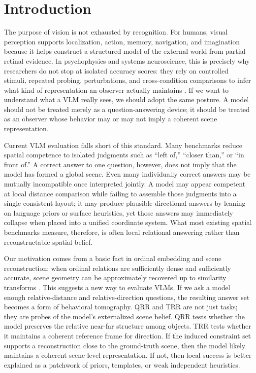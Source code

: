 \section{Introduction}

The purpose of vision is not exhausted by recognition. For humans, visual perception supports localization, action, memory, navigation, and imagination because it helps construct a structured model of the external world from partial retinal evidence. In psychophysics and systems neuroscience, this is precisely why researchers do not stop at isolated accuracy scores: they rely on controlled stimuli, repeated probing, perturbations, and cross-condition comparisons to infer what kind of representation an observer actually maintains \cite{kriegeskorte2008rsa,yamins2016dicarlo}. If we want to understand what a VLM really sees, we should adopt the same posture. A model should not be treated merely as a question-answering device; it should be treated as an observer whose behavior may or may not imply a coherent scene representation.

Current VLM evaluation falls short of this standard. Many benchmarks reduce spatial competence to isolated judgments such as ``left of,'' ``closer than,'' or ``in front of.'' A correct answer to one question, however, does not imply that the model has formed a global scene. Even many individually correct answers may be mutually incompatible once interpreted jointly. A model may appear competent at local distance comparison while failing to assemble those judgments into a single consistent layout; it may produce plausible directional answers by leaning on language priors or surface heuristics, yet those answers may immediately collapse when placed into a unified coordinate system. What most existing spatial benchmarks measure, therefore, is often local relational answering rather than reconstructable spatial belief.

Our motivation comes from a basic fact in ordinal embedding and scene reconstruction: when ordinal relations are sufficiently dense and sufficiently accurate, scene geometry can be approximately recovered up to similarity transforms \cite{agarwal2007gnmds,ma2018robustordinal,dokmanic2015edm}. This suggests a new way to evaluate VLMs. If we ask a model enough relative-distance and relative-direction questions, the resulting answer set becomes a form of behavioral tomography. QRR and TRR are not just tasks; they are probes of the model's externalized scene belief. QRR tests whether the model preserves the relative near-far structure among objects. TRR tests whether it maintains a coherent reference frame for direction. If the induced constraint set supports a reconstruction close to the ground-truth scene, then the model likely maintains a coherent scene-level representation. If not, then local success is better explained as a patchwork of priors, templates, or weak independent heuristics.

